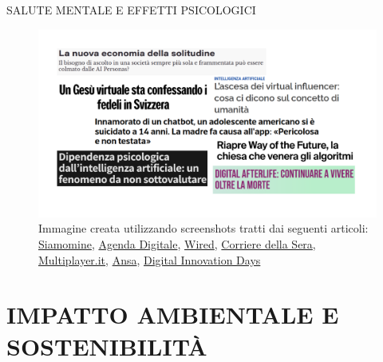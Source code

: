 \documentclass[aspectratio=1610]{beamer}
\begin{document}
\begin{frame}{SALUTE MENTALE E EFFETTI PSICOLOGICI}
    \begin{figure}
        \includegraphics[width=.9\linewidth]{img/saluteMentale.png}
        \caption{
            Immagine creata utilizzando screenshots tratti dai seguenti articoli:
            \href{https://siamomine.com/solitudine-salute-mentale-chat-bot-ia-artificiale}{Siamomine}, 
            \href{https://www.agendadigitale.eu/cultura-digitale/lascesa-dei-virtual-influencer-cosa-ci-dicono-sul-concetto-di-umanita/}{Agenda Digitale}, 
            \href{https://www.wired.it/article/gesu-virtuale-ai-svizzera/}{Wired}, 
            \href{https://www.corriere.it/tecnologia/24_ottobre_23/innamorato-di-un-chatbot-un-adolescente-americano-si-e-suicidato-a-14-anni-la-madre-fa-causa-all-app-pericolosa-e-non-testata-45697ab8-7316-46d3-bc01-60de5bb74xlk.shtml}{Corriere della Sera}, 
            \href{https://multiplayer.it/articoli/dipendenza-psicologica-dallintelligenza-artificiale-un-fenomeno-da-non-sottovalutare.html}{Multiplayer.it}, 
            \href{https://www.ansa.it/canale_tecnologia/notizie/future_tech/2023/11/27/riapre-way-of-the-future-la-chiesa-che-venera-gli-algoritmi_a5077e2f-7f13-410a-ad5d-5052988040dc.html}{Ansa}, 
            \href{https://digitalinnovationdays.com/risorse/digital-afterlife-continuare-a-vivere-oltre-la-morte}{Digital Innovation Days}
        }
    \end{figure}
\end{frame}

\section{IMPATTO AMBIENTALE E SOSTENIBILITÀ}
\end{document}
